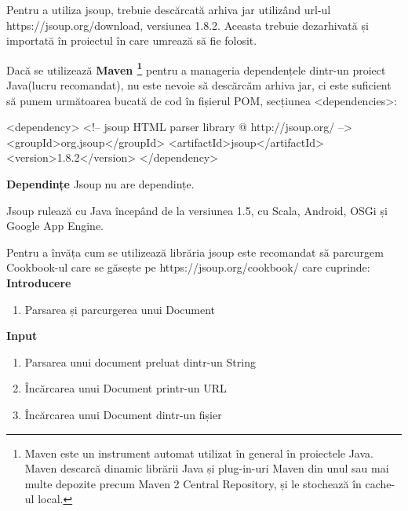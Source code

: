 Pentru a utiliza jsoup, trebuie descărcată arhiva jar utilizând url-ul https://jsoup.org/download, versiunea 1.8.2.\newline
Aceasta trebuie dezarhivată și importată în proiectul în care umrează să fie folosit.\newline

Dacă se utilizează \textbf{Maven \footnote{Maven este un instrument automat utilizat în general în proiectele Java. Maven descarcă dinamic librării Java și plug-in-uri Maven din unul sau mai multe depozite precum Maven 2 Central Repository, și le stochează în cache-ul local.}} pentru a manageria dependențele dintr-un proiect Java(lucru recomandat), nu este nevoie să descărcăm arhiva jar, ci este suficient să punem următoarea bucată de cod în fișierul POM, secțiunea <dependencies>: \newline

<dependency>\newline
  <!-- jsoup HTML parser library @ http://jsoup.org/ -->\newline
  <groupId>org.jsoup</groupId>\newline
  <artifactId>jsoup</artifactId>\newline
  <version>1.8.2</version>\newline
</dependency>\newline

\textbf{Dependințe}\newline
Jsoup nu are dependințe.\newline

Jsoup rulează cu Java începând de la versiunea 1.5, cu Scala, Android, OSGi și Google App Engine.\newline

Pentru a învăța cum se utilizează librăria jsoup este recomandat să parcurgem Cookbook-ul care se găsește pe https://jsoup.org/cookbook/ care cuprinde:\cite{18}\newline
\textbf{Introducere}
\begin{enumerate}
	\item Parsarea și parcurgerea unui Document
\end{enumerate}
\newpage
\textbf{Input}
\begin{enumerate}
	\item Parsarea unui document preluat dintr-un String
	\item Încărcarea unui Document printr-un URL
	\item Încărcarea unui Document dintr-un fișier
\end{enumerate}

